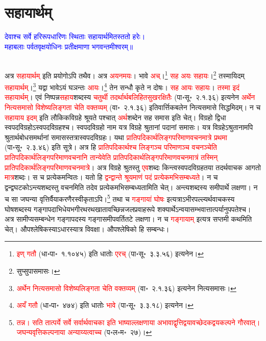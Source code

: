 \section[सहायार्थम्]{सहायार्थम्}
\centering\textcolor{blue}{देवाश्च सर्वे हरिरूपधारिणः स्थिताः सहायार्थमितस्ततो हरेः।\nopagebreak\\
महाबलाः पर्वतवृक्षयोधिनः प्रतीक्षमाणा भगवन्तमीश्वरम्॥}\nopagebreak\\
\\
\begin{sloppypar}\justifying\noindent\hspace{10mm} अत्र \textcolor{red}{सहायार्थम्} इति प्रयोगोऽपि तथैव। अत्र \textcolor{red}{अयनमयः}। भावे \textcolor{red}{अच्}।\footnote{\textcolor{red}{इण् गतौ} (धा॰पा॰~१.१०४५) इति धातोः \textcolor{red}{एरच्} (पा॰सू॰~३.३.५६) इत्यनेन।} \textcolor{red}{सह अयः सहायः}।\footnote{सुप्सुपासमासः।} तस्मायिदम् \textcolor{red}{सहायार्थम्}।\footnote{\textcolor{red}{अर्थेन नित्य\-समासो विशेष्य\-लिङ्गता चेति वक्तव्यम्‌} (वा॰~२.१.३६) इत्यनेन नित्यसमासः।} यद्वा भावेऽयं घञन्तः \textcolor{red}{आयः}।\footnote{\textcolor{red}{अयँ गतौ} (धा॰पा॰~४७४) इति धातोः \textcolor{red}{भावे} (पा॰सू॰~३.३.१८) इत्यनेन।} तेन सन्धौ कृते न दोषः। \textcolor{red}{सह आयः सहायः}। \textcolor{red}{तस्मा इदं सहायार्थम्}।
एवं निष्पन्न\-\textcolor{red}{सहाय}\-शब्दस्य \textcolor{red}{चतुर्थी तदर्थार्थ\-बलि\-हित\-सुख\-रक्षितैः} (पा॰सू॰~२.१.३६) इत्यनेन \textcolor{red}{अर्थेन नित्य\-समासो विशेष्य\-लिङ्गता चेति वक्तव्यम्} (वा॰~२.१.३६) इति\-वार्त्तिक\-बलेन नित्य\-समासे सिद्धमिदम्। न च \textcolor{red}{सहायाय इदम्} इति लौकिक\-विग्रहे श्रूयते पश्चात् \textcolor{red}{अर्थ}\-शब्देन सह समास इति चेत्। विग्रहो द्विधा स्वपद\-विग्रहोऽस्वपदविग्रहश्च। स्वपद\-विग्रहो नाम यत्र विग्रहे श्रुतानां पदानां समासः। यत्र विग्रहेऽश्रुतानामपि श्रुतार्थ\-बोध\-समर्थानां समासस्तत्रास्वपद\-विग्रहः। यथा \textcolor{red}{प्रातिपदिकार्थ\-लिङ्ग\-परिमाण\-वचन\-मात्रे प्रथमा} (पा॰सू॰~२.३.४६) इति सूत्रे। अत्र हि \textcolor{red}{प्रातिपदिकार्थश्च लिङ्गञ्च परिमाणञ्च वचनञ्चेति प्रातिपदिकार्थ\-लिङ्ग\-परिमाण\-वचनानि तान्येवेति प्रातिपदिकार्थ\-लिङ्ग\-परिमाण\-वचन\-मात्रं तस्मिन् प्रातिपदिकार्थ\-लिङ्ग\-परिमाण\-वचनमात्रे}। अत्र विग्रहे श्रुतस्तु \textcolor{red}{एव}\-शब्दः किन्त्वस्व\-पद\-विग्रहतया तदर्थ\-वाचक आगतो \textcolor{red}{मात्र}\-शब्दः। स च प्रत्येकमन्वितः। यतो हि \textcolor{red}{द्वन्द्वान्ते श्रूयमाणं पदं प्रत्येकमभिसम्बध्यते}। न च द्वन्द्व\-घटकोऽन्त्य\-शब्दस्तु वचनमिति तदेव प्रत्येकमभिसम्बध्यतामिति चेत्। अन्त्य\-शब्दस्य समीपार्थे लक्षणा। न च सा जघन्या वृत्तिर्वैयाकरणैरस्वीकृताऽपि।\footnote{\textcolor{red}{तन्न। सति तात्पर्ये सर्वे सर्वार्थवाचका इति भाष्याल्लक्षणाया अभावाद्वृत्ति\-द्वयावच्छेदक\-द्वय\-कल्पने गौरवात्। जघन्य\-वृत्ति\-कल्पनाया अन्याय्यत्वाच्च} (प॰ल॰म॰~२७)।} तथा च \textcolor{red}{गङ्गायां घोषः} इत्यत्राऽभीर\-पल्ल्यर्थ\-वाचकस्य घोष\-शब्दस्य गङ्गा\-पदाभिधेय\-भगीरथ\-रथ\-खातावच्छिन्न\-जल\-प्रवाह\-रूपे शक्यार्थेऽन्वयासम्भवात्तात्पर्यानुपपतेश्च। अत्र सामीप्य\-सम्बन्धेन गङ्गा\-पदस्य गङ्गा\-समीपवर्ति\-तटे लक्षणा। न च \textcolor{red}{गङ्गायाम्} इत्यत्र सप्तमी कथमिति चेत्। औपश्लेषिकस्याऽधारस्यात्र विवक्षा। औपश्लेषिको हि सम्बन्धः।

\end{sloppypar}
